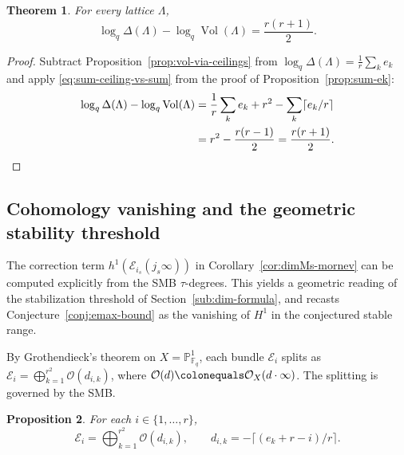 \documentclass[12pt]{amsart}
\newtheorem{thm}{Theorem}[section]
\newtheorem{prop}[thm]{Proposition}
\theoremstyle{definition}
\theoremstyle{remark}
\numberwithin{equation}{section}
\numberwithin{thm}{section}
\DeclareMathOperator{\Vol}{Vol}
\newcommand{\cE}{\mathcal{E}}
\newcommand{\cO}{\mathcal{O}}
\newcommand{\F}{\mathbb{F}}
\newcommand{\PP}{\mathbb{P}}
\newcommand{\La}{\Lambda}
\begin{document}
	\begin{thm}\label{thm:tag-vs-mor}
		For every lattice $\La$,
		\[
		\log_q\Delta(\La) - \log_q \Vol(\La) = \frac{r(r+1)}{2}.
		\]
	\end{thm}
	
	\begin{proof}
		Subtract Proposition~\ref{prop:vol-via-ceilings} from $\log_q \Delta(\La) = \frac{1}{r}\sum_k e_k$ and apply \eqref{eq:sum-ceiling-vs-sum} from the proof of Proposition~\ref{prop:sum-ek}:
		\begin{align*}
			\log_q \Delta(\La) - \log_q \Vol(\La) &= \frac{1}{r}\sum_k e_k + r^2 - \sum_k \lceil e_k/r\rceil \\
			&= r^2 - \frac{r(r-1)}{2} = \frac{r(r+1)}{2}. \qedhere
		\end{align*}
	\end{proof}
	
	\subsection{Cohomology vanishing and the geometric stability threshold}\label{sub:vanishing}
	
	The correction term $h^1(\cE_{i_s}(j_s\infty))$ in Corollary~\ref{cor:dimMs-mornev} can be computed explicitly from the SMB $\tau$-degrees. This yields a geometric reading of the stabilization threshold of Section~\ref{sub:dim-formula}, and recasts Conjecture~\ref{conj:emax-bound} as the vanishing of $H^1$ in the conjectured stable range.
	
	By Grothendieck's theorem on $X = \PP^1_{\F_q}$, each bundle $\cE_i$ splits as $\cE_i = \bigoplus_{k=1}^{r^2}\cO(d_{i,k})$, where $\cO(d) \colonequals \cO_X(d\cdot \infty)$. The splitting is governed by the SMB.
	
	\begin{prop}\label{prop:bundle-splitting}
		For each $i \in \{1, \ldots, r\}$,
		\[
		\cE_i = \bigoplus_{k=1}^{r^2} \cO(d_{i,k}), \qquad d_{i,k} = -\lceil (e_k + r - i)/r\rceil.
		\]
	\end{prop}
	
\end{document}
